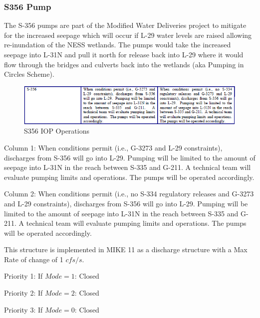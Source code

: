 \clearpage
\subsubsection{S356 Pump}
The S-356 pumps are part of the Modified Water Deliveries project to mitigate for the increased seepage which will occur if L-29 water levels are raised allowing re-inundation of the NESS wetlands.
The pumps would take the increased seepage into L-31N and pull it north for release back into L-29 where it would flow through the bridges and culverts back into the wetlands (aka Pumping in Circles Scheme).

\begin{figure}[!h]
  \begin{center}
  \includegraphics[width=6.5in]{../figs/S356_IOPops.png}
  \caption{S356 IOP Operations}
  \label{fig:S356iop}
  \end{center}
\end{figure}

Column 1:
When conditions permit (i.e., G-3273 and L-29 constraints), discharges from S-356 will go into L-29. Pumping will be limited to the amount of seepage into L-31N in the reach between S-335 and G-211. A technical team will evaluate pumping limits and operations. The pumps will be operated accordingly.

Column 2:
When conditions permit (i.e., no S-334 regulatory releases and G-3273 and L-29 constraints), discharges from S-356 will go into L-29. Pumping will be limited to the amount of seepage into L-31N in the reach between S-335 and G-211. A technical team will evaluate pumping limits and operations. The pumps will be operated accordingly.

This structure is implemented in MIKE 11 as a discharge structure with a Max Rate of change of 1 $cfs/s$.

\begin{packed_items}
\item Priority 1: If $Mode=1$: Closed
\item Priority 2: If $Mode=2$: Closed
\item Priority 3: If $Mode=0$: Closed
\end{packed_items}


